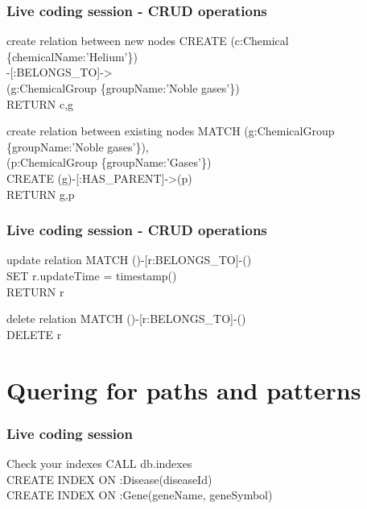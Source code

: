 \documentclass[12pt]{beamer}
\begin{document}
    \begin{frame}
        \frametitle{Live coding session - CRUD operations}
        \begin{block}{create relation between new nodes}
            CREATE (c:Chemical \{chemicalName:'Helium'\})\\
            \hspace{1cm} -[:BELONGS\_TO]-\textgreater\\
            \hspace{1cm} (g:ChemicalGroup \{groupName:'Noble gases'\})\\ 
            RETURN c,g
        \end{block}
        \begin{block}{create relation between existing nodes}
            MATCH (g:ChemicalGroup \{groupName:'Noble gases'\}),\\
            \hspace{1.4cm} (p:ChemicalGroup \{groupName:'Gases'\})\\
            CREATE (g)-[:HAS\_PARENT]-\textgreater(p)\\ 
            RETURN g,p
        \end{block}
    \end{frame}
    
    \begin{frame}
        \frametitle{Live coding session - CRUD operations}
        \begin{block}{update relation}
            MATCH ()-[r:BELONGS\_TO]-()\\
            \hspace{1cm} SET r.updateTime = timestamp()\\
            \hspace{1cm} RETURN r
        \end{block}
        \begin{block}{delete relation}
            MATCH ()-[r:BELONGS\_TO]-()\\
            \hspace{1cm} DELETE r
        \end{block}
    \end{frame}
    
    \section{Quering for paths and patterns}
    \begin{frame}
        \frametitle{Live coding session}
        \begin{block}{Check your indexes}
            CALL db.indexes\\
            CREATE INDEX ON :Disease(diseaseId)\\
            CREATE INDEX ON :Gene(geneName, geneSymbol)\\
        \end{block}
    \end{frame}
    
\end{document}
